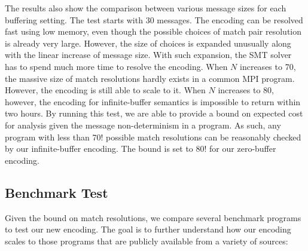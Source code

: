 The results also show the comparison between various message sizes for each buffering setting. The test starts with $30$ messages. The encoding can be resolved fast using low memory, even though the possible choices of match pair resolution is already very large. However, the size of choices is expanded unusually along with the linear increase of message size. With such expansion, the SMT solver has to spend much more time to resolve the encoding. When $\mathit{N}$ increases to 70, the massive size of match resolutions hardly exists in a common MPI program. However, the encoding is still able to scale to it. When $\mathit{N}$ increases to 80, however, the encoding for infinite-buffer semantics is impossible to return within two hours. By running this test, we are able to provide a bound on expected cost for analysis given the message non-determinism in a program. As such, any program with less than 70! possible match resolutions can be reasonably checked by our infinite-buffer encoding. The bound is set to 80! for our zero-buffer encoding.

\subsection{Benchmark Test}
Given the bound on match resolutions, we compare several benchmark programs to test our new encoding. The goal is to further understand how our encoding scales to those programs that are publicly available from a variety of sources:

